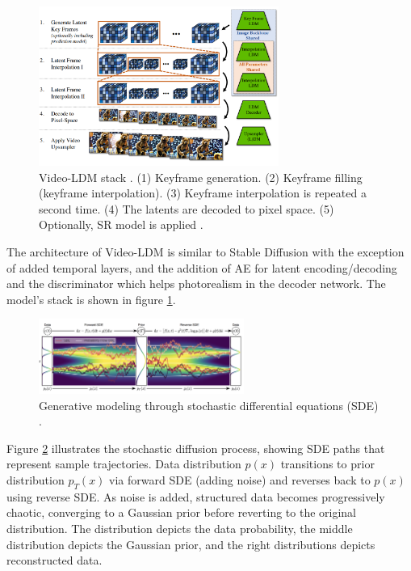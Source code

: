 \begin{figure}
    \centering
    \includegraphics[width=0.7\textwidth]{images/video_ldm/stack.png}
    \caption{Video-LDM stack \cite{video_ldm}. (1) Keyframe generation. (2) Keyframe filling (keyframe interpolation). (3) Keyframe interpolation is repeated a second time. (4) The latents are decoded to pixel space. (5) Optionally, SR model is applied \cite{video_ldm}.}
    \label{fig:video_ldm_stack}
\end{figure}

The architecture of Video-LDM is similar to Stable Diffusion with the exception of added temporal layers, and the addition of AE for latent encoding/decoding and the discriminator which helps photorealism in the decoder network. The model's stack is shown in figure \ref{fig:video_ldm_stack}.

\begin{figure}
    \centering
    \includegraphics[width=0.6\textwidth]{images/video_ldm/ddpm_sde.png}
    \caption{Generative modeling through stochastic differential equations (SDE) \cite{song2020score}.}
    \label{fig:video_ldm_ode}
\end{figure}

Figure \ref{fig:video_ldm_ode} illustrates the stochastic diffusion process, showing SDE paths that represent sample trajectories. Data distribution $p(x)$ transitions to prior distribution $p_T(x)$ via forward SDE (adding noise) and reverses back to $p(x)$ using reverse SDE. As noise is added, structured data becomes progressively chaotic, converging to a Gaussian prior before reverting to the original distribution. The distribution depicts the data probability, the middle distribution depicts the Gaussian prior, and the right distributions depicts reconstructed data.

